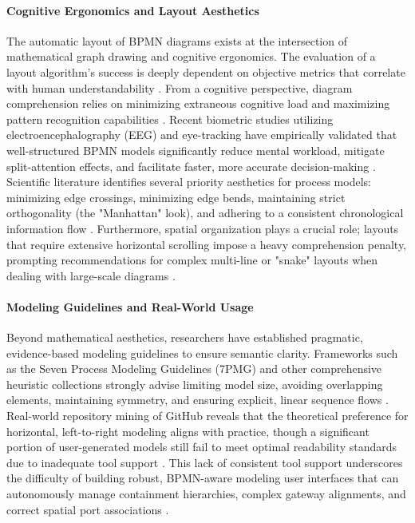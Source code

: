 \documentclass{article}
\begin{document}
	\paragraph{Cognitive Ergonomics and Layout Aesthetics}
	The automatic layout of BPMN diagrams exists at the intersection of mathematical graph drawing and cognitive ergonomics. The evaluation of a layout algorithm's success is deeply dependent on objective metrics that correlate with human understandability \cite{ref_purchase1997, ref_purchase2000}. From a cognitive perspective, diagram comprehension relies on minimizing extraneous cognitive load and maximizing pattern recognition capabilities \cite{ref_schrepfer}. Recent biometric studies utilizing electroencephalography (EEG) and eye-tracking have empirically validated that well-structured BPMN models significantly reduce mental workload, mitigate split-attention effects, and facilitate faster, more accurate decision-making \cite{ref_de_souza, ref_lubke_eye}. Scientific literature identifies several priority aesthetics for process models: minimizing edge crossings, minimizing edge bends, maintaining strict orthogonality (the "Manhattan" look), and adhering to a consistent chronological information flow \cite{ref_purchase1997, ref_corradini}. Furthermore, spatial organization plays a crucial role; layouts that require extensive horizontal scrolling impose a heavy comprehension penalty, prompting recommendations for complex multi-line or "snake" layouts when dealing with large-scale diagrams \cite{ref_lubke_eye}.
	
	\paragraph{Modeling Guidelines and Real-World Usage}
	Beyond mathematical aesthetics, researchers have established pragmatic, evidence-based modeling guidelines to ensure semantic clarity. Frameworks such as the Seven Process Modeling Guidelines (7PMG) and other comprehensive heuristic collections strongly advise limiting model size, avoiding overlapping elements, maintaining symmetry, and ensuring explicit, linear sequence flows \cite{ref_mendling, ref_corradini}. Real-world repository mining of GitHub reveals that the theoretical preference for horizontal, left-to-right modeling aligns with practice, though a significant portion of user-generated models still fail to meet optimal readability standards due to inadequate tool support \cite{ref_lubke_github, ref_baalmann_algo, ref_baalmann_val}. This lack of consistent tool support underscores the difficulty of building robust, BPMN-aware modeling user interfaces that can autonomously manage containment hierarchies, complex gateway alignments, and correct spatial port associations \cite{ref_jointjs, ref_effinger_patterns}. 
	
\end{document}
